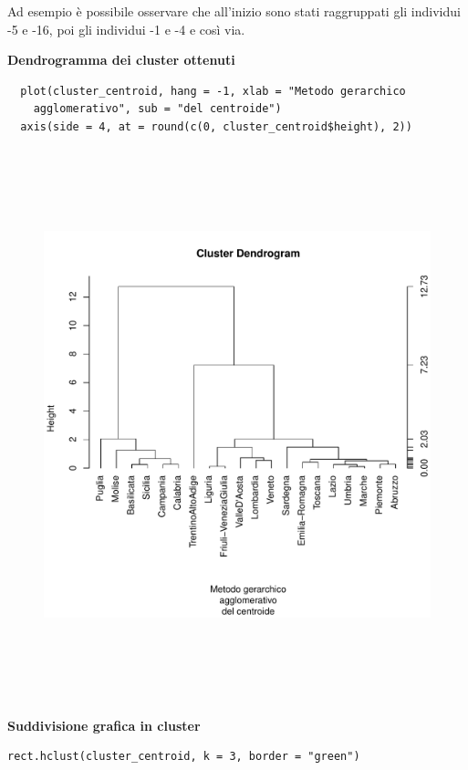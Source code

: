 Ad esempio è possibile osservare che all'inizio sono stati raggruppati gli individui -5 e -16, poi gli individui -1 e -4 e così via.

\textbf{Dendrogramma dei cluster ottenuti}

\vspace{5mm}
\begin{lstlisting}
  plot(cluster_centroid, hang = -1, xlab = "Metodo gerarchico
    agglomerativo", sub = "del centroide")
  axis(side = 4, at = round(c(0, cluster_centroid$height), 2))
\end{lstlisting}
\vspace{5mm}

\vspace{5mm}
\begin{figure}[!htbp]
    \centering
    \includegraphics[height=16cm]{ProgettoSAD/capitoli/images/clustering/dendro_clcentr.pdf}
\end{figure}
\vspace{5mm}

\noindent \textbf{Suddivisione grafica in cluster}

\vspace{5mm}
\begin{lstlisting}
rect.hclust(cluster_centroid, k = 3, border = "green")
\end{lstlisting}
\vspace{5mm}

